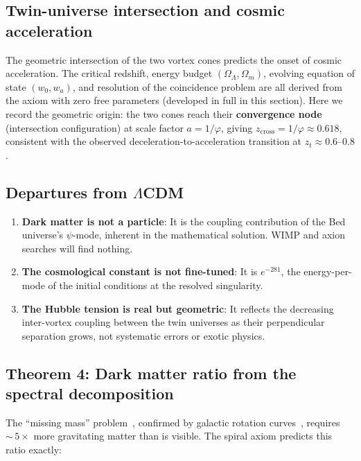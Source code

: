 \documentclass[12pt,a4paper]{article}
\newcommand{\bed}{Bed universe}
\begin{document}
\subsection{Twin-universe intersection and cosmic acceleration}
\label{sec:twin-intersection}
\label{sec:interaction-epoch}

The geometric intersection of the two vortex cones predicts the onset of cosmic acceleration.  The critical redshift, energy budget $(\Omega_\Lambda, \Omega_m)$, evolving equation of state $(w_0, w_a)$, and resolution of the coincidence problem are all derived from the axiom with zero free parameters (developed in full in this section).  Here we record the geometric origin: the two cones reach their \textbf{convergence node} (intersection configuration) at scale factor $a = 1/\varphi$, giving $z_{\mathrm{cross}} = 1/\varphi \approx 0.618$, consistent with the observed deceleration-to-acceleration transition at $z_t \approx 0.6$--$0.8$.

\subsection{Departures from $\Lambda$CDM}

\begin{enumerate}
\item \textbf{Dark matter is not a particle}: It is the coupling contribution of the \bed{}'s $\psi$-mode, inherent in the mathematical solution.  WIMP and axion searches will find nothing.
\item \textbf{The cosmological constant is not fine-tuned}: It is $e^{-281}$, the energy-per-mode of the initial conditions at the resolved singularity.
\item \textbf{The Hubble tension is real but geometric}: It reflects the decreasing inter-vortex coupling between the twin universes as their perpendicular separation grows, not systematic errors or exotic physics.
\end{enumerate}



\subsection{Theorem 4: Dark matter ratio from the spectral decomposition}
\label{sec:dm-ratio}

The ``missing mass'' problem~\cite{Zwicky1933}, confirmed by galactic rotation curves~\cite{RubinFord1970}, requires ${\sim}\,5\times$ more gravitating matter than is visible. The spiral axiom predicts this ratio exactly:
\end{document}
